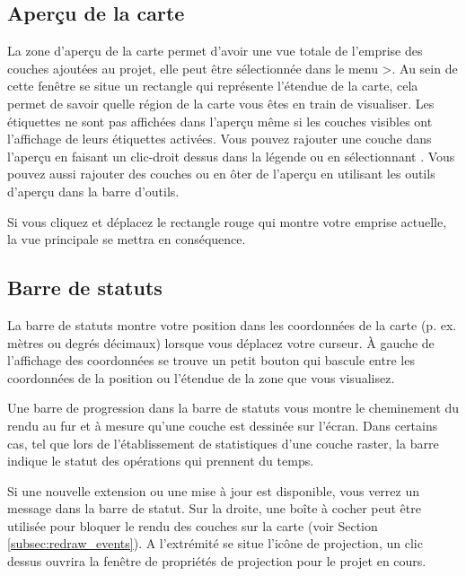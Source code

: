 \subsection{Aperçu de la carte}\label{label_mapoverview}

La zone d'aperçu de la carte permet d'avoir une vue totale de l'emprise des couches ajoutées au projet, elle peut être sélectionnée dans le menu >. Au sein de cette fenêtre se situe un rectangle qui représente l'étendue de la carte, cela permet de savoir quelle région de la carte vous êtes en train de visualiser. Les étiquettes ne sont pas affichées dans l'aperçu même si les couches visibles ont l'affichage de leurs étiquettes activées.
Vous pouvez rajouter une couche dans l'aperçu en faisant un clic-droit dessus dans la légende ou en sélectionnant . Vous pouvez aussi rajouter des couches ou en ôter de l'aperçu en utilisant les outils d'aperçu dans la barre d'outils.

Si vous cliquez et déplacez le rectangle rouge qui montre votre emprise actuelle, la vue principale se mettra en conséquence.

\subsection{Barre de statuts}\label{label_statusbar}

La barre de statuts montre votre position dans les coordonnées de la carte (p. ex. mètres ou degrés décimaux) lorsque vous déplacez votre curseur. À gauche de l'affichage des coordonnées se trouve un petit bouton qui bascule entre les coordonnées de la position ou l'étendue de la zone que vous visualisez.

Une barre de progression dans la barre de statuts vous montre le cheminement du rendu au fur et à mesure qu'une couche est dessinée sur l'écran. Dans certains cas, tel que lors de l'établissement de statistiques d'une couche raster, la barre indique le statut des opérations qui prennent du temps.

Si une nouvelle extension ou une mise à jour est disponible, vous verrez un message dans la barre de statut. Sur la droite, une boîte à cocher peut être utilisée pour bloquer le rendu des couches sur la carte (voir Section \ref{subsec:redraw_events}). A l'extrémité se situe l'icône de projection,  un clic dessus ouvrira la fenêtre de propriétés de projection pour le projet en cours.

